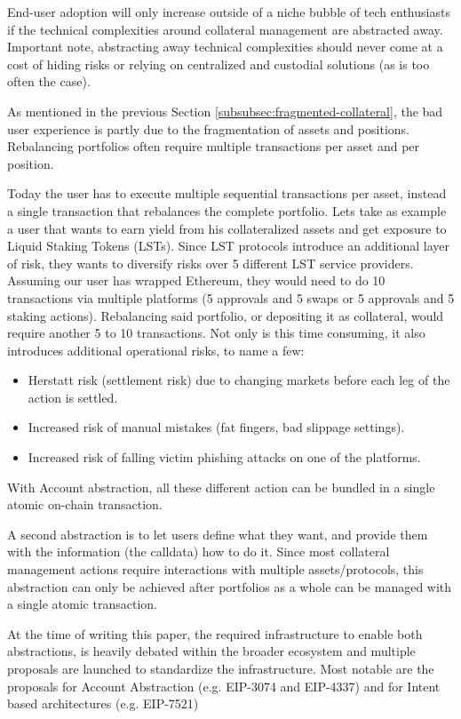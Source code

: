 \documentclass[sigconf,nonacm]{acmart}
\begin{document}
End-user adoption will only increase outside of a niche bubble of tech enthusiasts if the technical complexities around collateral management are abstracted away.
Important note, abstracting away technical complexities should never come at a cost of hiding risks or relying on centralized and custodial solutions (as is too often the case).

As mentioned in the previous Section \ref{subsubsec:fragmented-collateral}, the bad user experience is partly due to the fragmentation of assets and positions.
Rebalancing portfolios often require multiple transactions per asset and per position.

Today the user has to execute multiple sequential transactions per asset, instead a single transaction that rebalances the complete portfolio.
Lets take as example a user that wants to earn yield from his collateralized assets and get exposure to Liquid Staking Tokens (LSTs).
Since LST protocols introduce an additional layer of risk, they wants to diversify risks over 5 different LST service providers.
Assuming our user has wrapped Ethereum, they would need to do 10 transactions via multiple platforms (5 approvals and 5 swaps or 5 approvals and 5 staking actions).
Rebalancing said portfolio, or depositing it as collateral, would require another 5 to 10 transactions.
Not only is this time consuming, it also introduces additional operational risks, to name a few:
 \begin{itemize}
    \item Herstatt risk (settlement risk) due to changing markets before each leg of the action is settled.
    \item Increased risk of manual mistakes (fat fingers, bad slippage settings).
    \item Increased risk of falling victim phishing attacks on one of the platforms. 
\end{itemize}
With Account abstraction, all these different action can be bundled in a single atomic on-chain transaction.

A second abstraction is to let users define what they want, and provide them with the information (the calldata) how to do it.
Since most collateral management actions require interactions with multiple assets/protocols,
this abstraction can only be achieved after portfolios as a whole can be managed with a single atomic transaction.

At the time of writing this paper, the required infrastructure to enable both abstractions, is heavily debated within the broader ecosystem and multiple proposals are launched to standardize the infrastructure.
Most notable are the proposals for Account Abstraction (e.g. EIP-3074 and EIP-4337) and for Intent based architectures (e.g. EIP-7521)
\end{document}
